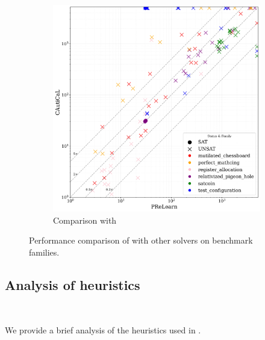 \begin{figure}[!t]
\begin{subfigure}[t]{0.45\textwidth}
        \includegraphics[width=\textwidth]{figs/prelearn_vs_cautical_interesting_legend.jpg}
        \caption{Comparison with \prelearn}
        \label{fig:cautical-vs-prelearn}
    \end{subfigure}

    \caption{Performance comparison of \tool with other solvers on benchmark families.}
    \label{fig:solver-comparison-familis}
\end{figure}


\subsection{Analysis of heuristics}~\label{subsec:eval-heuristics}

We provide a brief analysis of the heuristics used in \tool.


